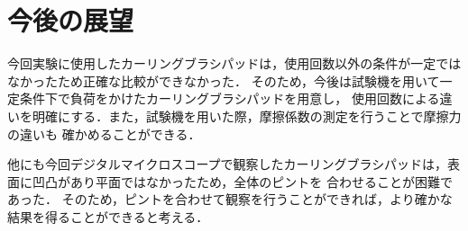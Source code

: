 \documentclass[main]{subfiles}
\begin{document}
\chapter{今後の展望}
今回実験に使用したカーリングブラシパッドは，使用回数以外の条件が一定ではなかったため正確な比較ができなかった．
そのため，今後は試験機を用いて一定条件下で負荷をかけたカーリングブラシパッドを用意し，
使用回数による違いを明確にする．また，試験機を用いた際，摩擦係数の測定を行うことで摩擦力の違いも
確かめることができる．

他にも今回デジタルマイクロスコープで観察したカーリングブラシパッドは，表面に凹凸があり平面ではなかったため，全体のピントを
合わせることが困難であった．
そのため，ピントを合わせて観察を行うことができれば，より確かな結果を得ることができると考える．
\end{document}

